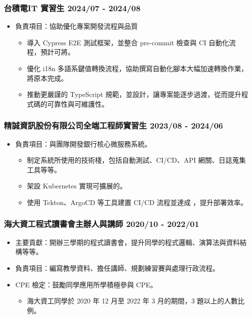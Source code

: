\subsubsection*{台積電\quad IT 實習生 \hfill 2024/07 - 2024/08}

\begin{itemize}
    \item 負責項目：協助優化專案開發流程與品質
    \begin{itemize}
        \item 導入 Cypress E2E 測試框架，並整合 pre-commit 檢查與 CI 自動化流程，預計可將。
        \item 優化 i18n 多語系鍵值轉換流程，協助撰寫自動化腳本大幅加速轉換作業，將原本完成。
        \item 推動更嚴謹的 TypeScript 規範，並設計，讓專案能逐步過渡，從而提升程式碼的可靠性與可維護性。
    \end{itemize}
\end{itemize}

\subsubsection*{精誠資訊股份有限公司\quad 全端工程師實習生 \hfill 2023/08 - 2024/06}

\begin{itemize}
    \item 負責項目：與團隊開發銀行核心微服務系統。
    \begin{itemize}
        \item 制定系統所使用的技術棧，包括自動測試、CI/CD、API 網關、日誌蒐集工具等等。
        \item 架設 Kubernetes 實現可擴展的。
        \item 使用 Tekton、ArgoCD 等工具建置 CI/CD 流程並達成 ，提升部署效率。
    \end{itemize}
\end{itemize}

\subsubsection*{海大資工程式讀書會\quad 主辦人與講師 \hfill 2020/10 - 2022/01}

\begin{itemize}
    \item 主要貢獻：開辦三學期的程式讀書會，提升同學的程式邏輯、演算法與資料結構等等。
    \item 負責項目：編寫教學資料、擔任講師、規劃練習賽與處理行政流程。
    \item CPE 檢定：鼓勵同學應用所學積極參與 CPE。
    \begin{itemize}
        \item 海大資工同學於 2020 年 12 月至 2022 年 3 月的期間，3 題以上的人數比例。
    \end{itemize}
\end{itemize}

